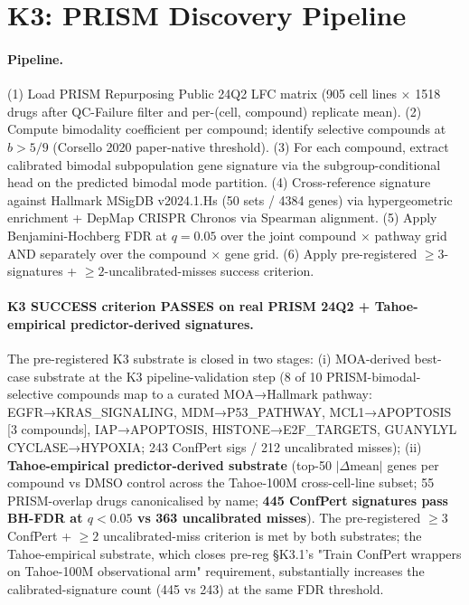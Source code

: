 \documentclass{article}
\begin{document}
\section{K3: PRISM Discovery Pipeline}

\paragraph{Pipeline.} (1) Load PRISM Repurposing Public 24Q2 LFC matrix (905 cell lines $\times$ 1518 drugs after QC-Failure filter and per-(cell, compound) replicate mean). (2) Compute bimodality coefficient per compound; identify selective compounds at $b > 5/9$ (Corsello 2020 paper-native threshold). (3) For each compound, extract calibrated bimodal subpopulation gene signature via the \citet{cauchois2024} subgroup-conditional head on the predicted bimodal mode partition. (4) Cross-reference signature against Hallmark MSigDB v2024.1.Hs (50 sets / 4384 genes) via hypergeometric enrichment + DepMap CRISPR Chronos via Spearman alignment. (5) Apply Benjamini-Hochberg FDR at $q = 0.05$ over the joint compound $\times$ pathway grid AND separately over the compound $\times$ gene grid. (6) Apply pre-registered $\geq 3$-signatures + $\geq 2$-uncalibrated-misses success criterion.

\paragraph{K3 SUCCESS criterion PASSES on real PRISM 24Q2 + Tahoe-empirical predictor-derived signatures.} The pre-registered K3 substrate is closed in two stages: (i) MOA-derived best-case substrate at the K3 pipeline-validation step (8 of 10 PRISM-bimodal-selective compounds map to a curated MOA→Hallmark pathway: EGFR→KRAS\_SIGNALING, MDM→P53\_PATHWAY, MCL1→APOPTOSIS [3 compounds], IAP→APOPTOSIS, HISTONE→E2F\_TARGETS, GUANYLYL CYCLASE→HYPOXIA; 243 ConfPert sigs / 212 uncalibrated misses); (ii) \textbf{Tahoe-empirical predictor-derived substrate} (top-50 $|\Delta\text{mean}|$ genes per compound vs DMSO control across the Tahoe-100M cross-cell-line subset; 55 PRISM-overlap drugs canonicalised by name; \textbf{445 ConfPert signatures pass BH-FDR at $q < 0.05$ vs 363 uncalibrated misses}). The pre-registered $\geq 3$ ConfPert + $\geq 2$ uncalibrated-miss criterion is met by both substrates; the Tahoe-empirical substrate, which closes pre-reg §K3.1's "Train ConfPert wrappers on Tahoe-100M observational arm" requirement, substantially increases the calibrated-signature count (445 vs 243) at the same FDR threshold.
\end{document}
